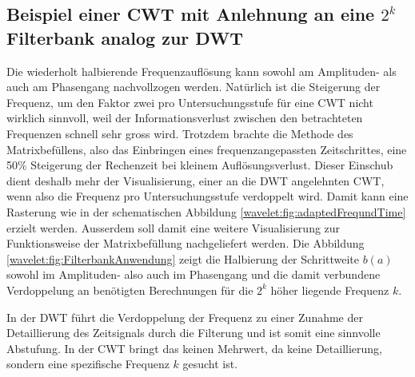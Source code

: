 
\subsection{Beispiel einer CWT mit Anlehnung an eine $2^k$ Filterbank analog zur DWT
	\label{wavelets:subsection:Radix2CWT}}
Die wiederholt halbierende Frequenzauflösung kann sowohl am Amplituden- als auch am Phasengang nachvollzogen werden. Natürlich ist die Steigerung der Frequenz, um den Faktor zwei pro Untersuchungsstufe für eine CWT nicht wirklich sinnvoll, weil der Informationsverlust zwischen den betrachteten Frequenzen schnell sehr gross wird. Trotzdem brachte die Methode des Matrixbefüllens, also das Einbringen eines frequenzangepassten Zeitschrittes, eine 50\% Steigerung der Rechenzeit bei kleinem Auflösungsverlust.
Dieser Einschub dient deshalb mehr der Visualisierung, einer an die DWT angelehnten CWT, wenn also die Frequenz pro Untersuchungsstufe verdoppelt wird. Damit kann eine Rasterung wie in der schematischen Abbildung \ref{wavelet:fig:adaptedFrequndTime} erzielt werden. Ausserdem soll damit eine weitere Visualisierung zur Funktionsweise der Matrixbefüllung nachgeliefert werden. Die Abbildung \ref{wavelet:fig:FilterbankAnwendung} zeigt die Halbierung der Schrittweite $b(a)$ sowohl im Amplituden- also auch im Phasengang und die damit verbundene Verdoppelung an benötigten Berechnungen für die $2^k$ höher liegende Frequenz $k$.

In der DWT führt die Verdoppelung der Frequenz zu einer Zunahme der Detaillierung des Zeitsignals durch die Filterung und ist somit eine sinnvolle Abstufung. In der CWT bringt das keinen Mehrwert, da keine Detaillierung, sondern eine spezifische Frequenz $k$ gesucht ist.
 
